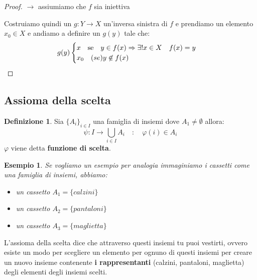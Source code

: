 \documentclass{article}
\newtheorem{exmp}{Esempio}[section]
\theoremstyle{definition}
\newtheorem{definition}{Definizione}[section]
\begin{document}
\begin{tcolorbox}
\begin{proof}
        $ \rightarrow $ assiumiamo che $ f$ sia iniettiva \par
        Costruiamo quindi un $ g : Y \to X $ un'inversa sinistra di $ f $ e prendiamo un elemento $x_0 \in X$ e andiamo a definire un $ g(y) $ tale che:
        \[ g(y)
        \begin{cases}
                x \quad \mbox{se} \quad y \in f(x) \Rightarrow \exists! x \in X \quad f(x) = y     \\
                x_0 \quad \mbox(se) y \not \in f(x)
        \end{cases}
        \]
\end{proof}
\end{tcolorbox}



\subsection{Assioma della scelta}\label{sec:assioma_della_scelta}
\begin{definition}
        Sia $ {\{A_i\}}_{i \in I} $ una famiglia di insiemi dove $ A_1 \not = \emptyset $ allora:
        \begin{equation*}
                \psi : I \to \bigcup_{i \in I}A_i \quad : \quad  \varphi(i) \in A_i 
        \end{equation*}
        $ \varphi $ viene detta \textbf{funzione di scelta}.
\end{definition}

\begin{exmp}
Se vogliamo un esempio per analogia immaginiamo i cassetti come una famiglia di insiemi, abbiamo:
\begin{itemize}
        \item un cassetto $ A_1 = \{calzini\} $ 
        \item un cassetto $ A_2 = \{pantaloni\} $ 
        \item un cassetto $ A_3 = \{maglietta\} $ 
\end{itemize}
\end{exmp}
L'assioma della scelta dice che attraverso questi insiemi tu puoi vestirti, ovvero esiste un modo per scegliere un elemento per ognuno di questi insiemi  per creare un nuovo insieme contenente \textbf{i rappresentanti} (calzini, pantaloni, maglietta) degli elementi degli insiemi scelti.\newpage
\end{document}

